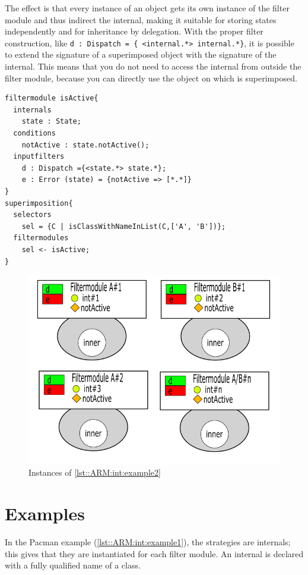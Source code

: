 The effect is that every instance of an object gets its own instance of the filter module and thus indirect the internal, making it suitable for storing states independently and for inheritance by delegation. 
With the proper filter construction, like \lstinline!d : Dispatch = { <internal.*> internal.*}!, it is possible to extend the signature of a superimposed object with the signature of the internal.
This means that you do not need to access the internal from outside the filter module, because you can directly
use the object on which is superimposed.

\begin{lstlisting}[caption = {Example 2, a filter module to hold a state}, label = lst::ARM:int:example2,
style=listing, language=ComposeStar, float = tpb]
filtermodule isActive{
  internals
    state : State;
  conditions
    notActive : state.notActive();
  inputfilters
    d : Dispatch ={<state.*> state.*};
    e : Error (state) = {notActive => [*.*]}
}
superimposition{
  selectors
    sel = {C | isClassWithNameInList(C,['A', 'B'])};
  filtermodules
    sel <- isActive;
}
\end{lstlisting}

\begin{figure}[tpb]
	\centering
	\includegraphics[style=thirdheight]{images/ARM-internalInitialization}
	\caption{Instances of \autoref{lst::ARM:int:example2}}
	\label{fig::arm::int:initialisation}
\end{figure}

\section{Examples}
In the Pacman example (\autoref{lst::ARM:int:example1}), the strategies are internals; this gives that they are instantiated for each filter module. 
An internal is declared with a fully qualified name of a class.

